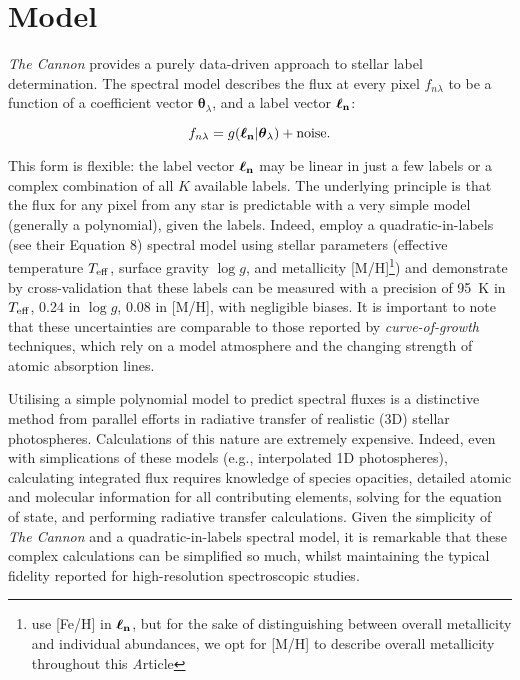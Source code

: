 \documentclass[useAMS,usenatbib]{mn2e}
\newcommand\article{\textit Article}
\newcommand\tc{\textit{The Cannon}}
\newcommand\lv{\bf{\boldsymbol\ell_n}}
\newcommand\cv{{\boldsymbol\theta}_\lambda}
\newcommand\given{|}
\begin{document}
\section{Model}


\tc{} provides a purely data-driven approach to stellar label determination. The
spectral model describes the flux at every pixel $f_{n\lambda}$ to be a function
of a coefficient vector $\cv$, and a label vector $\lv$:

\begin{equation}
    f_{n\lambda} = g(\lv\given\cv) + {\rm noise}.
\end{equation}

This form is flexible: the label vector $\lv$ may be linear in just a few labels
or a complex combination of all $K$ available labels. The underlying principle
is that the flux for any pixel from any star is predictable with a very simple
model (generally a polynomial), given the labels. Indeed, \citet{Ness2015}
employ a quadratic-in-labels (see their Equation 8) spectral model using stellar
parameters (effective temperature $T_{\rm eff}$, surface gravity $\log{g}$, and 
metallicity [M/H]\footnote{\citet{Ness2015} use [Fe/H] in $\lv$, but for the 
sake of distinguishing between overall metallicity and individual abundances,
we opt for [M/H] to describe overall metallicity throughout this \article{}})
and demonstrate by cross-validation that these labels can be 
measured with a precision of 95~K in $T_{\rm eff}$, 0.24 in $\log{g}$, 0.08 in 
[M/H], with negligible biases. It is important to note that these uncertainties
are comparable to those reported by \textit{curve-of-growth} techniques, which
rely on a model atmosphere and the changing strength of atomic absorption lines.

Utilising a simple polynomial model to predict spectral fluxes is a distinctive
method from parallel efforts in radiative transfer of realistic (3D) stellar 
photospheres. Calculations of this nature are extremely expensive. Indeed, even
with simplications of these models (e.g., interpolated 1D photospheres),
calculating integrated flux requires knowledge of species opacities, detailed 
atomic and molecular information for all contributing elements, solving for
the equation of state, and performing radiative transfer calculations. Given the
simplicity of \tc{} and a quadratic-in-labels spectral model, it is remarkable
that these complex calculations can be simplified so much, whilst maintaining
the typical fidelity reported for high-resolution spectroscopic studies.
\end{document}
